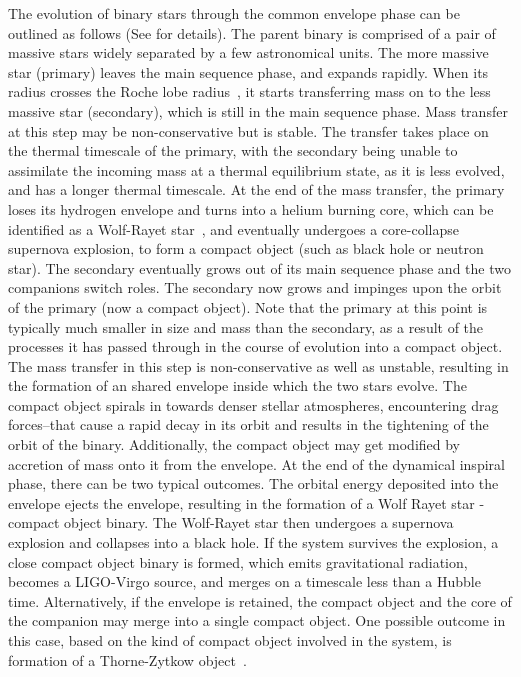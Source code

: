 The evolution of binary stars through the common envelope phase can be outlined as follows (See \cite{Postnov:2014tza,2013A&ARv..21...59I,Mandel:2018hfr} for details). The parent binary is comprised of a pair of massive stars widely separated by a few astronomical units. The more massive star (primary) leaves the main sequence phase, and expands rapidly. When its radius crosses the Roche lobe radius~\cite{1983ApJ...268..368E}, it starts transferring mass on to the less massive star (secondary), which is still in the main sequence phase. Mass transfer at this step may be non-conservative but is stable. The transfer takes place on the thermal timescale of the primary, with the secondary being unable to assimilate the incoming mass at a thermal equilibrium state, as it is less evolved, and has a longer thermal timescale. At the end of the mass transfer, the primary loses its hydrogen envelope and turns into a helium burning core, which can be identified as a Wolf-Rayet star~\cite{1967AcA....17..355P}, and eventually undergoes a core-collapse supernova explosion, to form a compact object (such as black hole or neutron star). %
The secondary eventually grows out of its main sequence phase and the two companions switch roles. The secondary now grows and impinges upon the orbit of the primary (now a compact object). Note that the primary at this point is typically much smaller in size and mass than the secondary, as a result of the processes it has passed through in the course of evolution into a compact object. The mass transfer in this step is non-conservative as well as unstable, resulting in the formation of an shared envelope inside which the two stars evolve. %
The compact object spirals in towards denser stellar atmospheres, encountering drag forces--that cause a rapid decay in its orbit and results in the tightening of the orbit of the binary. Additionally, the compact object may get modified by accretion of mass onto it from the envelope. At the end of the dynamical inspiral phase, there can be two typical outcomes. The orbital energy deposited into the envelope ejects the envelope, resulting in the formation of a Wolf Rayet star - compact object binary. The Wolf-Rayet star then undergoes a supernova explosion and collapses into a black hole. If the system survives the explosion, a close compact object binary is formed, which emits gravitational radiation, becomes a LIGO-Virgo source, and merges on a timescale less than a Hubble time. Alternatively, if the envelope is retained, the compact object and the core of the companion may merge into a single compact object. One possible outcome in this case, based on the kind of compact object involved in the system, is formation of a Thorne-Zytkow object~\cite{1977ApJ...212..832T,2014MNRAS.443L..94L}.

